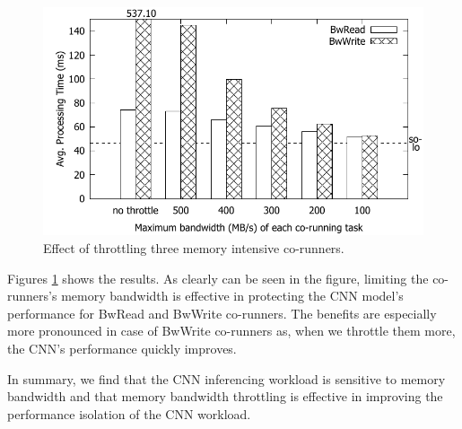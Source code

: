\begin{figure}[h]
  \centering
  \includegraphics[width=.45\textwidth]{figs/memguard_bandwidth}
  \caption{Effect of throttling three memory intensive co-runners.} 
  \label{fig:memguard_bandwidth}
\end{figure}

Figures \ref{fig:memguard_bandwidth} shows the results.
As clearly can be seen in the figure, limiting the co-runners's memory
bandwidth is effective in protecting the CNN model's performance for
BwRead and BwWrite co-runners. The benefits are especially more
pronounced in case of BwWrite co-runners as, when we throttle them more, the
CNN's performance quickly improves.


In summary, we find that the CNN inferencing workload is sensitive to
memory bandwidth and that memory bandwidth throttling is effective in
improving the performance isolation of the CNN workload.





